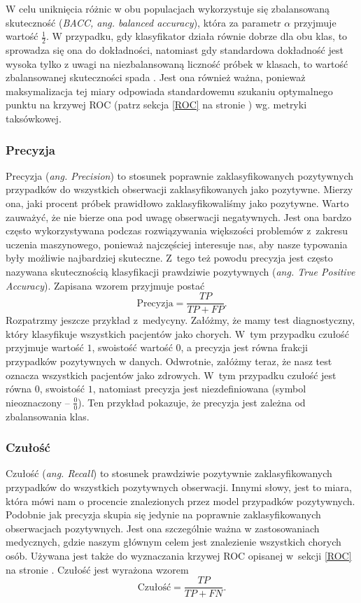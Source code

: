 \documentclass[inzynierska]{pwr_wmat_praca_dyplomowa}
\theoremstyle{plain}
\numberwithin{theorem}{chapter}
\theoremstyle{definition}
\numberwithin{theorem}{chapter}
\begin{document}
W celu uniknięcia różnic w obu populacjach wykorzystuje się zbalansowaną skuteczność (\textit{BACC, ang. balanced accuracy}), która za parametr $\alpha$ przyjmuje wartość $\frac{1}{2}$. W przypadku, gdy klasyfikator działa równie dobrze dla obu klas, to sprowadza się ona do dokładności, natomiast gdy standardowa dokładność jest wysoka tylko z uwagi na niezbalansowaną liczność próbek w klasach, to wartość zbalansowanej skuteczności spada \cite{balanced_accuracy}. Jest ona również ważna, ponieważ maksymalizacja tej miary odpowiada standardowemu szukaniu optymalnego punktu na krzywej ROC (patrz sekcja \ref{ROC} na stronie \pageref{ROC}) wg. metryki taksówkowej.

\subsubsection{Precyzja}
Precyzja (\textit{ang. Precision}) to stosunek poprawnie zaklasyfikowanych pozytywnych przypadków do wszystkich obserwacji zaklasyfikowanych jako pozytywne. Mierzy ona, jaki procent próbek prawidłowo zaklasyfikowaliśmy jako pozytywne. Warto zauważyć, że nie bierze ona pod uwagę obserwacji negatywnych. Jest ona bardzo często wykorzystywana podczas rozwiązywania większości problemów z~zakresu uczenia maszynowego, ponieważ najczęściej interesuje nas, aby nasze typowania były możliwie najbardziej skuteczne. Z~tego też powodu precyzja jest często nazywana skutecznością klasyfikacji prawdziwie pozytywnych (\textit{ang. True Positive Accuracy}). Zapisana wzorem przyjmuje postać
$$ \text{Precyzja} = \frac{TP}{TP + FP} \text{.}$$
Rozpatrzmy jeszcze przykład z~medycyny. Załóżmy, że mamy test diagnostyczny, który klasyfikuje wszystkich pacjentów jako chorych. W~tym przypadku czułość przyjmuje wartość $1$, swoistość wartość $0$, a precyzja jest równa frakcji przypadków pozytywnych w danych. Odwrotnie, załóżmy teraz, że nasz test oznacza wszystkich pacjentów jako zdrowych. W~tym przypadku czułość jest równa $0$, swoistość $1$, natomiast precyzja jest niezdefiniowana (symbol nieoznaczony -- $\frac{0}{0}$). Ten przykład pokazuje, że precyzja jest zależna od zbalansowania klas.

\subsubsection{Czułość}
Czułość (\textit{ang. Recall}) to stosunek prawdziwie pozytywnie zaklasyfikowanych przypadków do wszystkich pozytywnych obserwacji. Innymi słowy, jest to miara, która mówi nam o procencie znalezionych przez model przypadków pozytywnych. Podobnie jak precyzja skupia się jedynie na poprawnie zaklasyfikowanych obserwacjach pozytywnych. Jest ona szczególnie ważna w zastosowaniach medycznych, gdzie naszym głównym celem jest znalezienie wszystkich chorych osób. Używana jest także do wyznaczania krzywej ROC opisanej w~sekcji \ref{ROC} na stronie \pageref{ROC}. Czułość jest wyrażona wzorem
$$ \text{Czułość}= \frac{TP}{TP + FN} \text{.}$$
\end{document}
